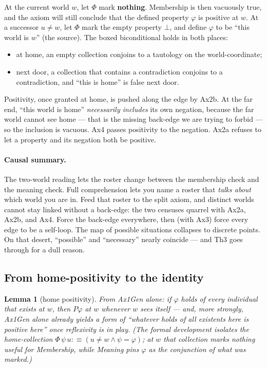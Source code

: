 \documentclass[11pt]{article}
\newtheorem{lemma}[theorem]{Lemma}
\begin{document}
At the current world
\(w\), let \(\Phi\) mark \textbf{nothing}. Membership is then vacuously true, and the axiom
will still conclude that the defined property \(\varphi\) is positive at \(w\). At a
successor \(u \neq w\), let \(\Phi\) mark the empty property \(\bot\), and define \(\varphi\)
to be ``this world is \(w\)'' (the source). The boxed biconditional holds in both places:
\begin{itemize}
\item at home, an empty collection conjoins to a tautology on the world-coordinate;
\item next door, a collection that contains a contradiction conjoins to a contradiction,
and ``this is home'' is false next door.
\end{itemize}
Positivity, once granted at home, is pushed along the edge by Ax2b. At the far end, ``this
world is home'' \emph{necessarily includes} its own negation, because the far world cannot
see home --- that is the missing back-edge we are trying to forbid --- so the inclusion is
vacuous. Ax4 passes positivity to the negation. Ax2a refuses to let a property and its
negation both be positive.

\paragraph{Causal summary.}
The two-world reading lets the roster change between the membership check and the meaning
check. Full comprehension lets you name a roster that \emph{talks about} which world you
are in. Feed that roster to the split axiom, and distinct worlds cannot stay linked without
a back-edge: the two censuses quarrel with Ax2a, Ax2b, and Ax4. Force the back-edge
everywhere, then (with Ax3) force every edge to be a self-loop. The map of possible
situations collapses to discrete points. On that desert, ``possible'' and ``necessary''
nearly coincide --- and Th3 goes through for a dull reason.

\subsection{From home-positivity to the identity}

\begin{lemma}[home positivity]
From Ax1Gen alone: if \(\varphi\) holds of every individual that exists at \(w\), then
\(P\varphi\) at \(w\) whenever \(w\) sees itself --- and, more strongly, Ax1Gen alone
already yields a form of ``whatever holds of all existents here is positive here'' once
reflexivity is in play. (The formal development isolates the home-collection
\(\Phi\,\psi\,u :\equiv (u \neq w \land \psi = \varphi)\); at \(w\) that collection marks
nothing useful for Membership, while Meaning pins \(\varphi\) as the conjunction of what
was marked.)
\end{lemma}
\end{document}
